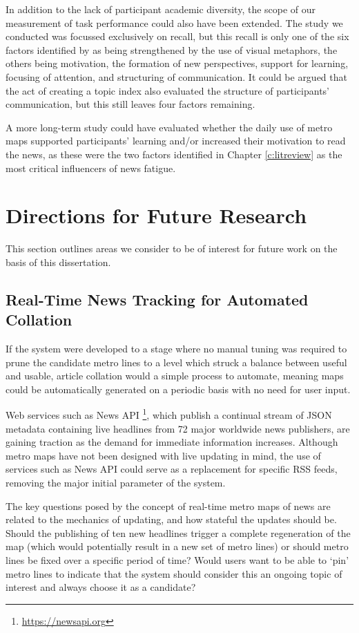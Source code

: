 In addition to the lack of participant academic diversity, the scope of our measurement of task performance could also have been extended. The study we conducted was focussed exclusively on recall, but this recall is only one of the six factors identified by \cite{VisuelleKommunikation} as being strengthened by the use of visual metaphors, the others being motivation, the formation of new perspectives, support for learning, focusing of attention, and structuring of communication. It could be argued that the act of creating a topic index also evaluated the structure of participants' communication, but this still leaves four factors remaining.  

A more long-term study could have evaluated whether the daily use of metro maps supported participants' learning and/or increased their motivation to read the news, as these were the two factors identified in Chapter \ref{c:litreview} as the most critical influencers of news fatigue.


\section{Directions for Future Research}

This section outlines areas we consider to be of interest for future work on the basis of this dissertation.

\subsection{Real-Time News Tracking for Automated Collation}

If the system were developed to a stage where no manual tuning was required to prune the candidate metro lines to a level which struck a balance between useful and usable, article collation would a simple process to automate, meaning maps could be automatically generated on a periodic basis with no need for user input.

Web services such as News API \footnote{\url{https://newsapi.org}}, which publish a continual stream of JSON metadata containing live headlines from 72 major worldwide news publishers, are gaining traction as the demand for immediate information increases. Although metro maps have not been designed with live updating in mind, the use of services such as News API could serve as a replacement for specific RSS feeds, removing the major initial parameter of the system.

The key questions posed by the concept of real-time metro maps of news are related to the mechanics of updating, and how stateful the updates should be. Should the publishing of ten new headlines trigger a complete regeneration of the map (which would potentially result in a new set of metro lines) or should metro lines be fixed over a specific period of time? Would users want to be able to `pin' metro lines to indicate that the system should consider this an ongoing topic of interest and always choose it as a candidate?

